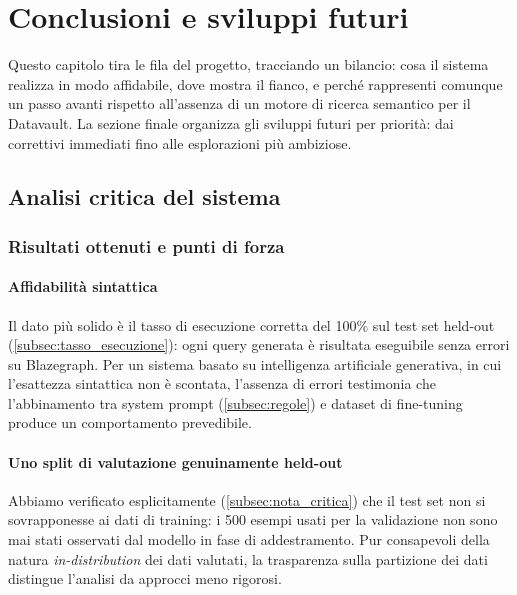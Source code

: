 \chapter{Conclusioni e sviluppi futuri}\label{chap:conclusioni}

Questo capitolo tira le fila del progetto, tracciando un bilancio: cosa il sistema realizza in modo affidabile, dove mostra il fianco, e perché rappresenti comunque un passo avanti rispetto all'assenza di un motore di ricerca semantico per il Datavault.
La sezione finale organizza gli sviluppi futuri per priorità: dai correttivi immediati fino alle esplorazioni più ambiziose.

\section{Analisi critica del sistema}\label{sec:orgoglio_modestia}

\subsection{Risultati ottenuti e punti di forza}\label{subsec:punti_forza}

\subsubsection{Affidabilità sintattica}

Il dato più solido è il tasso di esecuzione corretta del 100\% sul test set held-out (\cref{subsec:tasso_esecuzione}): ogni query generata è risultata eseguibile senza errori su Blazegraph. Per un sistema basato su intelligenza artificiale generativa, in cui l'esattezza sintattica non è scontata, l'assenza di errori testimonia che l'abbinamento tra system prompt (\cref{subsec:regole}) e dataset di fine-tuning produce un comportamento prevedibile.

\subsubsection{Uno split di valutazione genuinamente held-out}

Abbiamo verificato esplicitamente (\cref{subsec:nota_critica}) che il test set non si sovrapponesse ai dati di training: i 500 esempi usati per la validazione non sono mai stati osservati dal modello in fase di addestramento. Pur consapevoli della natura \textit{in-distribution} dei dati valutati, la trasparenza sulla partizione dei dati distingue l'analisi da approcci meno rigorosi.

